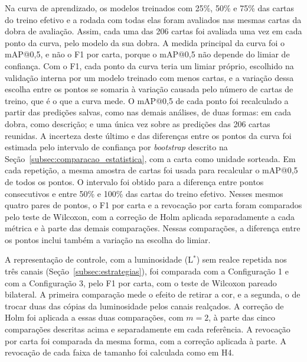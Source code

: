 \documentclass[
    12pt,                %
    openright,           %
    oneside,             %
    a4paper,             %
    english,             %
    brazil               %
]{abntex2}
\begin{document}
Na curva de aprendizado, os modelos treinados com 25\%, 50\% e 75\% das cartas do treino efetivo e
a rodada com todas elas foram avaliados nas mesmas cartas da dobra de
avaliação. Assim, cada uma das 206 cartas foi avaliada uma vez em cada
ponto da curva, pelo modelo da sua dobra. A medida principal da curva
foi o mAP@0,5, e não o F1 por carta, porque o mAP@0,5 não depende do
limiar de confiança. Com o F1, cada
ponto da curva teria um limiar próprio, escolhido na validação interna
por um modelo treinado com menos cartas, e a variação dessa escolha
entre os pontos se somaria à variação causada pelo número de cartas de
treino, que é o que a curva mede. O mAP@0,5 de cada ponto foi
recalculado a partir das predições salvas, como nas demais análises, de
duas formas: em cada dobra, como descrição; e uma única vez sobre as
predições das 206 cartas reunidas. A
incerteza deste último e das diferenças entre os
pontos da curva foi estimada pelo intervalo de confiança por
\textit{bootstrap} descrito na
Seção~\ref{subsec:comparacao_estatistica}, com a carta como unidade
sorteada. Em cada repetição, a mesma amostra de cartas foi usada para
recalcular o mAP@0,5 de todos os pontos. O intervalo foi obtido para a
diferença entre pontos consecutivos e entre 50\% e 100\% das cartas do
treino efetivo. Nesses mesmos quatro pares de pontos, o F1 por carta e
a revocação por carta foram comparados pelo teste de Wilcoxon, com a
correção de Holm aplicada separadamente a cada métrica e à parte das demais comparações.
Nessas comparações, a diferença entre os pontos inclui também a
variação na escolha do limiar.

A representação de controle, com a luminosidade (L$^*$) sem realce
repetida nos três canais (Seção~\ref{subsec:estrategias}), foi
comparada com a Configuração 1 e com a Configuração 3, pelo F1 por
carta, com o teste de Wilcoxon pareado bilateral. A
primeira comparação mede o efeito de retirar a cor, e a segunda, o de
trocar duas das cópias da luminosidade pelos canais realçados. A
correção de Holm foi aplicada a essas duas comparações, com $m = 2$, à
parte das cinco comparações descritas acima e separadamente em cada
referência. A revocação por carta foi
comparada da mesma forma, com a correção aplicada à parte. A revocação
de cada faixa de tamanho foi calculada como em H4.
\end{document}
